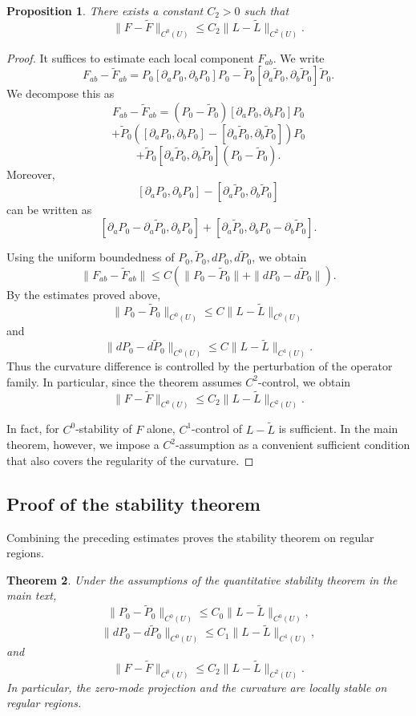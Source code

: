 \documentclass[pdflatex,sn-mathphys-num]{sn-jnl}%
\theoremstyle{thmstyleone}%
\newtheorem{theorem}{Theorem}%
\newtheorem{proposition}[theorem]{Proposition}%
\theoremstyle{thmstyletwo}%
\theoremstyle{thmstylethree}%
\begin{document}
\begin{appendices}
\begin{proposition}
There exists a constant \(C_2>0\) such that
\[
\|F-\widetilde F\|_{C^0(U)}
\le
C_2\|L-\widetilde L\|_{C^2(U)}.
\]
\end{proposition}

\begin{proof}
It suffices to estimate each local component \(F_{ab}\). We write
\[
F_{ab}-\widetilde F_{ab}
=
P_0[\partial_aP_0,\partial_bP_0]P_0
-
\widetilde P_0[\partial_a\widetilde P_0,\partial_b\widetilde P_0]\widetilde P_0.
\]
We decompose this as
\[
F_{ab}-\widetilde F_{ab}
=
(P_0-\widetilde P_0)[\partial_aP_0,\partial_bP_0]P_0
\]
\[
+
\widetilde P_0
\left(
[\partial_aP_0,\partial_bP_0]
-
[\partial_a\widetilde P_0,\partial_b\widetilde P_0]
\right)
P_0
\]
\[
+
\widetilde P_0[\partial_a\widetilde P_0,\partial_b\widetilde P_0](P_0-\widetilde P_0).
\]
Moreover,
\[
[\partial_aP_0,\partial_bP_0]
-
[\partial_a\widetilde P_0,\partial_b\widetilde P_0]
\]
can be written as
\[
[\partial_aP_0-\partial_a\widetilde P_0,\partial_bP_0]
+
[\partial_a\widetilde P_0,\partial_bP_0-\partial_b\widetilde P_0].
\]

Using the uniform boundedness of \(P_0,\widetilde P_0,dP_0,d\widetilde P_0\), we obtain
\[
\|F_{ab}-\widetilde F_{ab}\|
\le
C
\left(
\|P_0-\widetilde P_0\|
+
\|dP_0-d\widetilde P_0\|
\right).
\]
By the estimates proved above,
\[
\|P_0-\widetilde P_0\|_{C^0(U)}
\le
C\|L-\widetilde L\|_{C^0(U)}
\]
and
\[
\|dP_0-d\widetilde P_0\|_{C^0(U)}
\le
C\|L-\widetilde L\|_{C^1(U)}.
\]
Thus the curvature difference is controlled by the perturbation of the operator family. In particular, since the theorem assumes \(C^2\)-control, we obtain
\[
\|F-\widetilde F\|_{C^0(U)}
\le
C_2\|L-\widetilde L\|_{C^2(U)}.
\]

In fact, for \(C^0\)-stability of \(F\) alone, \(C^1\)-control of \(L-\widetilde L\) is sufficient. In the main theorem, however, we impose a \(C^2\)-assumption as a convenient sufficient condition that also covers the regularity of the curvature.
\end{proof}

\subsection{Proof of the stability theorem}

Combining the preceding estimates proves the stability theorem on regular regions.

\begin{theorem}
Under the assumptions of the quantitative stability theorem in the main text,
\[
\|P_0-\widetilde P_0\|_{C^0(U)}
\le
C_0\|L-\widetilde L\|_{C^0(U)},
\]
\[
\|dP_0-d\widetilde P_0\|_{C^0(U)}
\le
C_1\|L-\widetilde L\|_{C^1(U)},
\]
and
\[
\|F-\widetilde F\|_{C^0(U)}
\le
C_2\|L-\widetilde L\|_{C^2(U)}.
\]
In particular, the zero-mode projection and the curvature are locally stable on regular regions.
\end{theorem}


\end{appendices}
\end{document}
